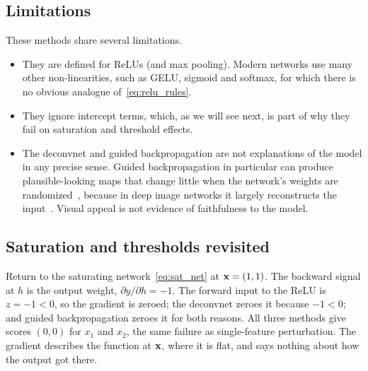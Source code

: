 \subsection{Limitations}

These methods share several limitations.
\begin{itemize}
  \item They are defined for ReLUs (and max pooling). Modern networks use many other non-linearities, such as GELU, sigmoid and softmax, for which there is no obvious analogue of~\eqref{eq:relu_rules}.
  \item They ignore intercept terms, which, as we will see next, is part of why they fail on saturation and threshold effects.
  \item The deconvnet and guided backpropagation are not explanations of the model in any precise sense. Guided backpropagation in particular can produce plausible-looking maps that change little when the network's weights are randomized~\citep{adebayo2018}, because in deep image networks it largely reconstructs the input~\citep{nie2018}. Visual appeal is not evidence of faithfulness to the model.
\end{itemize}

\subsection{Saturation and thresholds revisited}
\label{sec:failure_modes}

Return to the saturating network~\eqref{eq:sat_net} at $\mathbf{x}=(1,1)$. The backward signal at $h$ is the output weight, $\partial y/\partial h=-1$. The forward input to the ReLU is $z=-1<0$, so the gradient is zeroed; the deconvnet zeroes it because $-1<0$; and guided backpropagation zeroes it for both reasons. All three methods give scores $(0,0)$ for $x_1$ and $x_2$, the same failure as single-feature perturbation. The gradient describes the function at $\mathbf{x}$, where it is flat, and says nothing about how the output got there.

